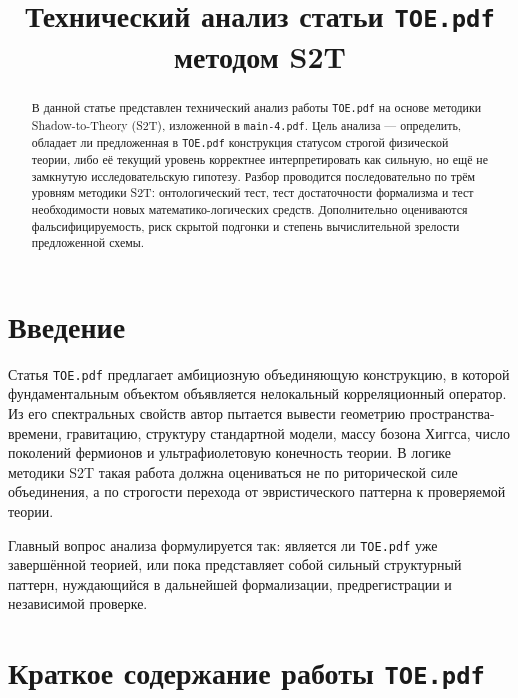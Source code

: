 \documentclass[12pt,a4paper]{article}
\title{Технический анализ статьи \texttt{TOE.pdf} методом S2T}
\author{}
\date{}
\begin{document}
\maketitle

\begin{abstract}
В данной статье представлен технический анализ работы \texttt{TOE.pdf} на основе методики Shadow-to-Theory (S2T), изложенной в \texttt{main-4.pdf}. Цель анализа --- определить, обладает ли предложенная в \texttt{TOE.pdf} конструкция статусом строгой физической теории, либо её текущий уровень корректнее интерпретировать как сильную, но ещё не замкнутую исследовательскую гипотезу. Разбор проводится последовательно по трём уровням методики S2T: онтологический тест, тест достаточности формализма и тест необходимости новых математико-логических средств. Дополнительно оцениваются фальсифицируемость, риск скрытой подгонки и степень вычислительной зрелости предложенной схемы.
\end{abstract}

\section{Введение}

Статья \texttt{TOE.pdf} предлагает амбициозную объединяющую конструкцию, в которой фундаментальным объектом объявляется нелокальный корреляционный оператор. Из его спектральных свойств автор пытается вывести геометрию пространства-времени, гравитацию, структуру стандартной модели, массу бозона Хиггса, число поколений фермионов и ультрафиолетовую конечность теории. В логике методики S2T такая работа должна оцениваться не по риторической силе объединения, а по строгости перехода от эвристического паттерна к проверяемой теории.

Главный вопрос анализа формулируется так: является ли \texttt{TOE.pdf} уже завершённой теорией, или пока представляет собой сильный структурный паттерн, нуждающийся в дальнейшей формализации, предрегистрации и независимой проверке.

\section{Краткое содержание работы \texttt{TOE.pdf}}
\end{document}
